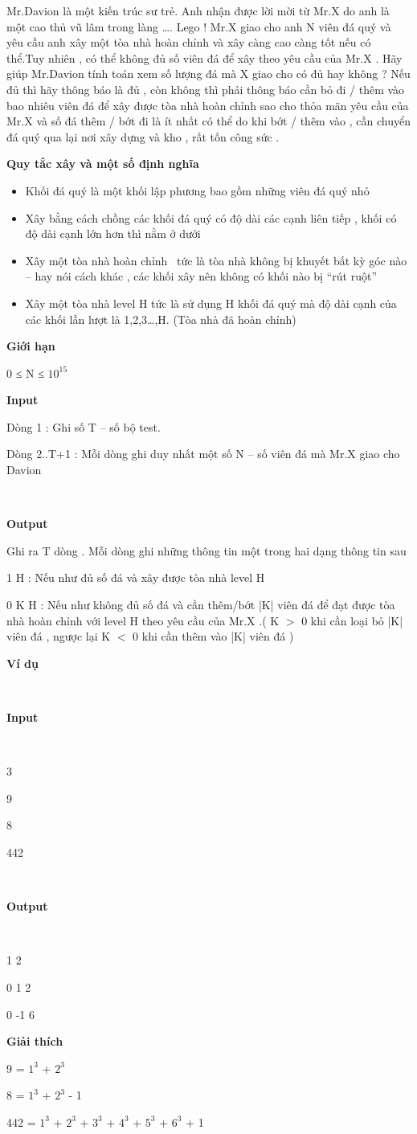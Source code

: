 

Mr.Davion là một kiến trúc sư trẻ. Anh nhận được lời mời từ Mr.X do anh là một cao thủ vũ lâm trong làng …. Lego ! Mr.X giao cho anh N viên đá quý và yêu cầu anh xây một tòa nhà hoàn chỉnh và xây càng cao càng tốt nếu có thể.Tuy nhiên , có thể không đủ số viên đá để xây theo yêu cầu của Mr.X . Hãy giúp Mr.Davion tính toán xem số lượng đá mà X giao cho có đủ hay không ? Nếu đủ thì hãy thông báo là đủ , còn không thì phải thông báo cần bỏ đi / thêm vào bao nhiêu viên đá để xây được tòa nhà hoàn chỉnh sao cho thỏa mãn yêu cầu của Mr.X và số đá thêm / bớt đi là ít nhất có thể do khi bớt / thêm vào , cần chuyển đá quý qua lại nơi xây dựng và kho , rất tốn công sức .

\textbf{Quy tắc xây và một số định nghĩa}
\begin{itemize}
	\item Khối đá quý là một khối lập phương bao gồm những viên đá quý nhỏ 
	\item Xây bằng cách chồng các khối đá quý có độ dài các cạnh liên tiếp , khối có độ dài cạnh lớn hơn thì nằm ở dưới
	\item Xây một tòa nhà hoàn chỉnh  tức là tòa nhà không bị khuyết bất kỳ góc nào – hay nói cách khác , các khối xây nên không có khối nào bị “rút ruột”
	\item Xây một tòa nhà level H tức là sử dụng H khối đá quý mà độ dài cạnh của các khối lần lượt là 1,2,3…,H. (Tòa nhà đã hoàn chỉnh)
\end{itemize}

\textbf{Giới hạn }

0 ≤ N ≤ $10^{15}$

\textbf{Input }

Dòng 1 : Ghi số T – số bộ test.

Dòng 2..T+1 : Mỗi dòng ghi duy nhất một số N – số viên đá mà Mr.X giao cho Davion

 

\textbf{Output }

Ghi ra T dòng . Mỗi dòng ghi những thông tin một trong hai dạng thông tin sau

1 H : Nếu như đủ số đá và xây được tòa nhà level H

0 K H : Nếu như không đủ số đá và cần thêm/bớt |K| viên đá để đạt được tòa nhà hoàn chỉnh với level H theo yêu cầu của Mr.X .( K $>$ 0 khi cần loại bỏ |K| viên đá , ngược lại K $<$ 0 khi cần thêm vào |K| viên đá )

\textbf{Ví dụ }

 

\textbf{Input}


 

3

9

8

442

 

\textbf{Output}


 

1 2

0 1 2

0 -1 6

\textbf{Giải thích}

9 = $1^{3}$ + $2^{3}$

8 = $1^{3}$ + $2^{3}$ - 1

442 = $1^{3}$ + $2^{3}$ + $3^{3}$ + $4^{3}$ + $5^{3}$ + $6^{3}$ + 1
